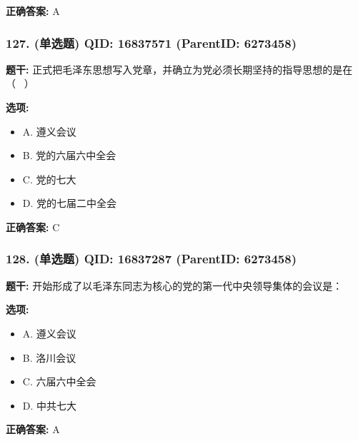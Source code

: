 \documentclass[12pt,UTF8]{ctexart}
\begin{document}
\textbf{正确答案:}
A

\vspace{0.3em}\hrulefill\vspace{0.7em}

\subsubsection*{127. (单选题) \small QID: 16837571 (ParentID: 6273458)}

\textbf{题干:}
正式把毛泽东思想写入党章，并确立为党必须长期坚持的指导思想的是在（  ）



\textbf{选项:}
\begin{itemize}[leftmargin=*]

  \item A. 遵义会议

  \item B. 党的六届六中全会

  \item C. 党的七大

  \item D. 党的七届二中全会

\end{itemize}

\textbf{正确答案:}
C

\vspace{0.3em}\hrulefill\vspace{0.7em}

\subsubsection*{128. (单选题) \small QID: 16837287 (ParentID: 6273458)}

\textbf{题干:}
开始形成了以毛泽东同志为核心的党的第一代中央领导集体的会议是：



\textbf{选项:}
\begin{itemize}[leftmargin=*]

  \item A. 遵义会议

  \item B. 洛川会议

  \item C. 六届六中全会

  \item D. 中共七大

\end{itemize}

\textbf{正确答案:}
A
\end{document}
